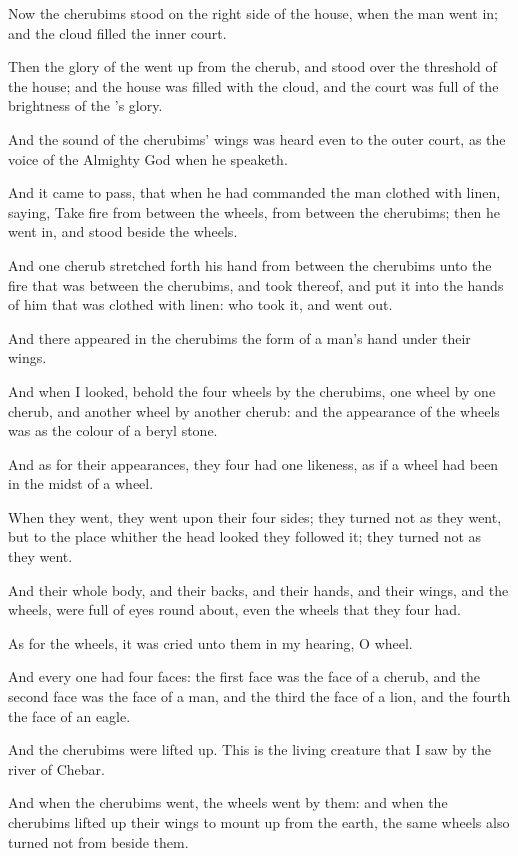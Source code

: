 \Verse Now the cherubims stood on the right side of the house, when the man went in; and the cloud filled the inner court.

\Verse Then the glory of the \LORD went up from the cherub, and stood over the threshold of the house; and the house was filled with the cloud, and the court was full of the brightness of the \LORD's glory.

\Verse And the sound of the cherubims' wings was heard even to the outer court, as the voice of the Almighty God when he speaketh.

\Verse And it came to pass, that when he had commanded the man clothed with linen, saying, Take fire from between the wheels, from between the cherubims; then he went in, and stood beside the wheels.

\Verse And one cherub stretched forth his hand from between the cherubims unto the fire that was between the cherubims, and took thereof, and put it into the hands of him that was clothed with linen: who took it, and went out.

\Verse And there appeared in the cherubims the form of a man's hand under their wings.

\Verse And when I looked, behold the four wheels by the cherubims, one wheel by one cherub, and another wheel by another cherub: and the appearance of the wheels was as the colour of a beryl stone.

\Verse And as for their appearances, they four had one likeness, as if a wheel had been in the midst of a wheel.

\Verse When they went, they went upon their four sides; they turned not as they went, but to the place whither the head looked they followed it; they turned not as they went.

\Verse And their whole body, and their backs, and their hands, and their wings, and the wheels, were full of eyes round about, even the wheels that they four had.

\Verse As for the wheels, it was cried unto them in my hearing, O wheel.

\Verse And every one had four faces: the first face was the face of a cherub, and the second face was the face of a man, and the third the face of a lion, and the fourth the face of an eagle.

\Verse And the cherubims were lifted up. This is the living creature that I saw by the river of Chebar.

\Verse And when the cherubims went, the wheels went by them: and when the cherubims lifted up their wings to mount up from the earth, the same wheels also turned not from beside them.

